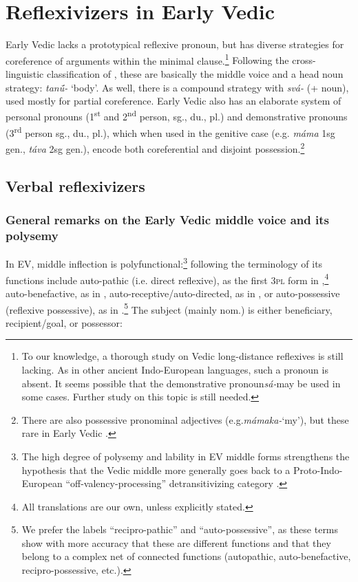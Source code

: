 \documentclass[output=paper]{langscibook}
\begin{document}
\section{Reflexivizers in Early Vedic}
\label{sec:Orqueda:2}

Early Vedic lacks a prototypical reflexive pronoun, but has diverse strategies for coreference of arguments within the minimal clause.\footnote{{{To our knowledge, a thorough study on Vedic long-distance reflexives is still lacking. As in other ancient Indo-European languages, such a pronoun is absent. It seems possible that the demonstrative pronoun}{\textit{sá-}}{may be used in some cases. Further study on this topic is still needed.}}}{ Following the cross-linguistic classification of \citet{Faltz1977}, these are basically the middle voice and a head noun strategy: \textit{tan\'{ū}-} ‘body’. As well, there is a compound strategy with \textit{svá-} (+ noun), used mostly for partial coreference. Early Vedic also has an elaborate system of personal pronouns (1\textsuperscript{st} and 2\textsuperscript{nd} person, sg., du., pl.) and demonstrative pronouns (3\textsuperscript{rd} person sg., du., pl.), which when used in the genitive case (e.g. \textit{máma} 1sg gen., \textit{táva} 2sg gen.), encode both coreferential and disjoint possession.}\footnote{{{There are also possessive pronominal adjectives (e.g.}{\textit{mámaka-}}{‘my’), but these rare in Early Vedic \citep[305]{Macdonell1910}.}}}



\subsection{Verbal reflexivizers}
\label{sec:Orqueda:2.1}

\subsubsection{General remarks on the Early Vedic middle voice and its polysemy}
\label{sec:Orqueda:2.1.1}


In EV, middle inflection is polyfunctional:\footnote{{{The high degree of polysemy and lability in EV middle forms strengthens the hypothesis that the Vedic middle more generally goes back to a Proto-Indo-European “off-valency-processing” detransitivizing category \citep{Pooth2014}.}}}{ following the terminology of  its functions include {auto-pathic} (i.e. direct reflexive), as the first 3\textsc{pl} form in ,}\footnote{{{All translations are our own, unless explicitly stated.} }}{ {auto-benefactive}, as in , {auto-receptive}/{auto-directed}, as in , or {auto-possessive} (reflexive possessive), as in .}\footnote{{{We prefer the labels “recipro-pathic” and “auto-possessive”, as these terms show with more accuracy that these are different functions and that they belong to a complex net of connected functions (autopathic, auto-benefactive, recipro-possessive, etc.).}}}{ The subject (mainly nom.) is either beneficiary, recipient/goal, or possessor:}
\end{document}
